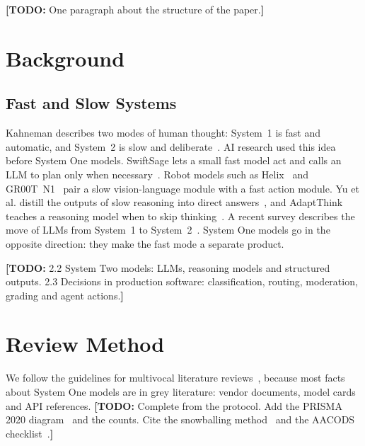 \documentclass[acmsmall,nonacm,screen]{acmart}
\newcommand{\todo}[1]{{\color{red}\textbf{[TODO: }#1\textbf{]}}}
\newcommand{\sones}{System One models\xspace}
\newcommand{\stwos}{System Two models\xspace}
\begin{document}
\todo{One paragraph about the structure of the paper.}

\section{Background}
\label{sec:background}
\subsection{Fast and Slow Systems}
Kahneman describes two modes of human thought: System~1 is fast and automatic, and System~2 is slow and deliberate~\cite{kahneman2011thinking}. AI research used this idea before \sones. SwiftSage lets a small fast model act and calls an LLM to plan only when necessary~\cite{lin2023swiftsage}. Robot models such as Helix~\cite{figure2025helix} and GR00T~N1~\cite{nvidia2025gr00t} pair a slow vision-language module with a fast action module. Yu et al. distill the outputs of slow reasoning into direct answers~\cite{yu2024distilling}, and AdaptThink teaches a reasoning model when to skip thinking~\cite{zhang2025adaptthink}. A recent survey describes the move of LLMs from System~1 to System~2~\cite{li2025system}. \sones go in the opposite direction: they make the fast mode a separate product.

\todo{2.2 \stwos: LLMs, reasoning models and structured outputs. 2.3 Decisions in production software: classification, routing, moderation, grading and agent actions.}

\section{Review Method}
\label{sec:method}
We follow the guidelines for multivocal literature reviews~\cite{garousi2019guidelines}, because most facts about \sones are in grey literature: vendor documents, model cards and API references. \todo{Complete from the protocol. Add the PRISMA 2020 diagram~\cite{page2021prisma} and the counts. Cite the snowballing method~\cite{wohlin2014guidelines} and the AACODS checklist~\cite{tyndall2010aacods}.}
\end{document}
